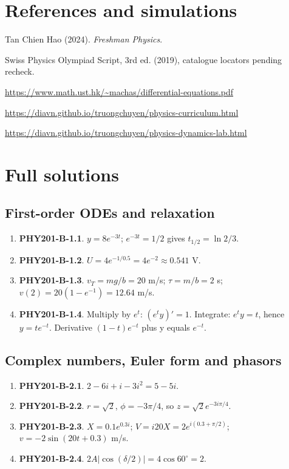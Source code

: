 \documentclass[11pt,a4paper,openany]{book}
\begin{document}
\chapter*{References and simulations}
Tan Chien Hao (2024). \textit{Freshman Physics}.\par
Swiss Physics Olympiad Script, 3rd ed. (2019), catalogue locators pending recheck.\par
\url{https://www.math.ust.hk/~machas/differential-equations.pdf}\par
\url{https://diavn.github.io/truongchuyen/physics-curriculum.html}\par
\url{https://diavn.github.io/truongchuyen/physics-dynamics-lab.html}
\appendix
\chapter{Full solutions}
\section{First-order ODEs and relaxation}
\begin{enumerate}
\item \textbf{PHY201-B-1.1}. $y=8e^{-3t}$; $e^{-3t}=1/2$ gives $t_{1/2}=\ln2/3$.
\item \textbf{PHY201-B-1.2}. $U=4e^{-1/0.5}=4e^{-2}\approx0.541$ V.
\item \textbf{PHY201-B-1.3}. $v_T=mg/b=20$ m/s; $\tau=m/b=2$ s; $v(2)=20(1-e^{-1})=12.64$ m/s.
\item \textbf{PHY201-B-1.4}. Multiply by $e^t$: $(e^ty)'=1$. Integrate: $e^ty=t$, hence $y=te^{-t}$. Derivative $(1-t)e^{-t}$ plus y equals $e^{-t}$.
\end{enumerate}
\section{Complex numbers, Euler form and phasors}
\begin{enumerate}
\item \textbf{PHY201-B-2.1}. $2-6i+i-3i^2=5-5i$.
\item \textbf{PHY201-B-2.2}. $r=\sqrt2$, $\phi=-3\pi/4$, so $z=\sqrt2e^{-3i\pi/4}$.
\item \textbf{PHY201-B-2.3}. $X=0.1e^{0.3i}$; $V=i20X=2e^{i(0.3+\pi/2)}$; $v=-2\sin(20t+0.3)$ m/s.
\item \textbf{PHY201-B-2.4}. $2A|\cos(\delta/2)|=4\cos60^\circ=2$.
\end{enumerate}
\end{document}
